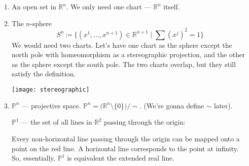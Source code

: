 \begin{enumerate}
    \item {
        An open set in $\mathbb{R}^n$. We only need one chart --- $\mathbb{R}^n$ itself.
    }
    \item {
        The $n$-sphere 
        \[
             S^n \coloneqq \{ (x^1, \dots, x^{n+1}) \in \mathbb{R}^{n+1}
             \mid {\textstyle \sum} (x^j)^2 = 1 \} 
        \]
        We would need two charts. Let's have one chart as
        the sphere except the north pole with homeomorphism as a stereographic projection,
        and the other as the sphere except the south pole.
        The two charts overlap, but they still satisfy the definition.

        \begin{figure*}[h]
            \centering
            \texttt{[image: stereographic]}
        \end{figure*}
    }
    \item {
        $\mathbb{P}^n$ --- projective space.
        $\mathbb{P}^n = \bigl(\mathbb{R}^n \setminus \{0\} \bigr) / \sim$.
        (We're gonna define $\sim$ later).

        $\mathbb{P}^1$ --- the set of all lines in $\mathbb{R}^2$ passing through
        the origin:
        \begin{center}   
        \end{center}
        Every non-horizontal line passing through the origin can be mapped onto 
        a point on the red line. A horizontal line corresponds to the 
        point at infinity. So, essentially, $\mathbb{P}^1$ 
        is equivalent the extended real line. 

}
\end{enumerate}
